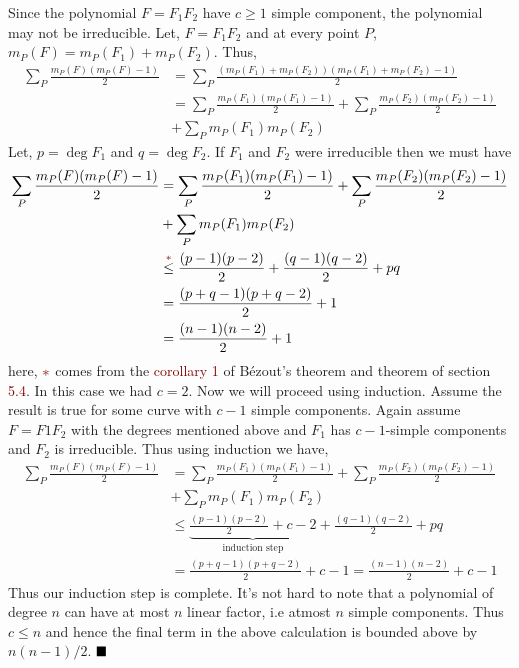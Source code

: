 \documentclass[12pt]{article}
\begin{document}
Since the polynomial $F=F_1F_2$ have $c\geq 1$ simple component, the polynomial may not be irreducible. Let, $F=F_1F_2$ and at every point $P$, $m_P(F)= m_P(F_1)+m_P(F_2)$. Thus, \begin{align*}
   \sum_P \frac{m_P(F)(m_P(F)-1)}{2} & = \sum_{P} \frac{(m_P(F_1)+m_P(F_2))(m_P(F_1)+m_P(F_2)-1)}{2}                       \\
                                     & = \sum_{P} \frac{m_P(F_1)(m_P(F_1)-1)}{2} + \sum_{P} \frac{m_P(F_2)(m_P(F_2)-1)}{2} \\&+ \sum_{P}m_P(F_1)m_P(F_2)
\end{align*}
Let, $p = \deg F_1$ and $q = \deg F_2$. If $F_1$ and $F_2$ were irreducible then we must have \begin{align*}
   \sum_P \frac{m_P(F)(m_P(F)-1)}{2}
    & = \sum_{P} \frac{m_P(F_1)(m_P(F_1)-1)}{2} + \sum_{P} \frac{m_P(F_2)(m_P(F_2)-1)}{2}     \\&+ \sum_{P}m_P(F_1)m_P(F_2) \\
    & \overset{\textcolor{maroon}{\ast}}{\leq} \frac{(p-1)(p-2)}{2}+\frac{(q-1)(q-2)}{2} + pq \\
    & = \frac{(p+q-1)(p+q-2)}{2} +1                                                           \\
    & = \frac{(n-1)(n-2)}{2}+1
\end{align*}
here, $\textcolor{maroon}{\ast}$ comes from the \textcolor{maroon}{corollary 1} of B\'ezout's theorem and theorem of section \textcolor{maroon}{5.4}. In this case we had $c=2$. Now we will proceed using induction. Assume the result is true for some curve with $c-1$ simple components. Again assume $F=F1F_2$ with the degrees mentioned above and $F_1$ has $c-1$-simple components and $F_2$ is irreducible. Thus using induction we have,
\begin{align*}
   \sum_P \frac{m_P(F)(m_P(F)-1)}{2}
    & = \sum_{P} \frac{m_P(F_1)(m_P(F_1)-1)}{2} + \sum_{P} \frac{m_P(F_2)(m_P(F_2)-1)}{2}          \\&+ \sum_{P}m_P(F_1)m_P(F_2)\\
    & \leq \underbrace{\frac{(p-1)(p-2)}{2}+c-2}_{\text{induction step}}+\frac{(q-1)(q-2)}{2} + pq \\
    & = \frac{(p+q-1)(p+q-2)}{2} +c-1 = \frac{(n-1)(n-2)}{2}+c-1
\end{align*}
Thus our induction step is complete. It's not hard to note that a polynomial of degree $n$ can have at most $n$ linear factor, i.e atmost $n$ simple components. Thus $c \leq n$ and hence the final term in the above calculation is bounded above by $n(n-1)/2$. $\hfill\blacksquare$
\end{document}
